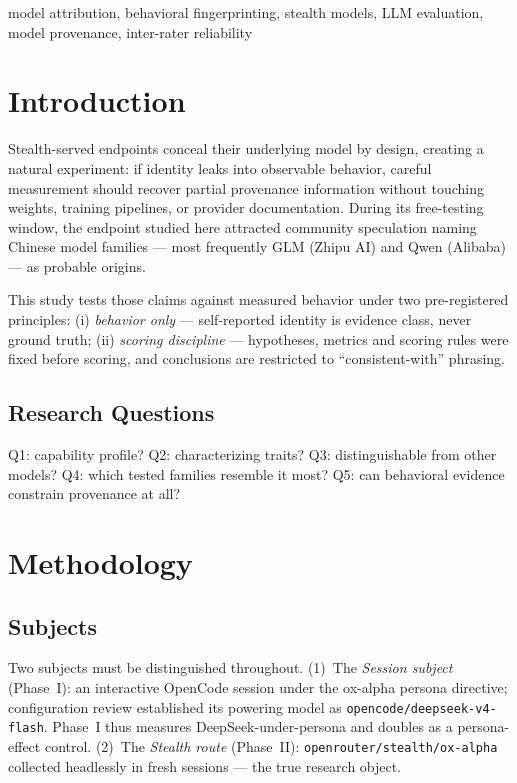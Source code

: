 \documentclass[conference]{IEEEtran}
\begin{document}
\begin{IEEEkeywords}
model attribution, behavioral fingerprinting, stealth models, LLM evaluation, model provenance, inter-rater reliability
\end{IEEEkeywords}

\section{Introduction}
Stealth-served endpoints conceal their underlying model by design, creating a natural experiment: if identity leaks into observable behavior, careful measurement should recover partial provenance information without touching weights, training pipelines, or provider documentation. During its free-testing window, the endpoint studied here attracted community speculation naming Chinese model families --- most frequently GLM (Zhipu AI) and Qwen (Alibaba) --- as probable origins.

This study tests those claims against measured behavior under two pre-registered principles: (i) \emph{behavior only} --- self-reported identity is evidence class, never ground truth; (ii) \emph{scoring discipline} --- hypotheses, metrics and scoring rules were fixed before scoring, and conclusions are restricted to ``consistent-with'' phrasing.

\subsection{Research Questions}
Q1: capability profile? Q2: characterizing traits? Q3: distinguishable from other models? Q4: which tested families resemble it most? Q5: can behavioral evidence constrain provenance at all?

\section{Methodology}

\subsection{Subjects}
Two subjects must be distinguished throughout. (1)~The \emph{Session subject} (Phase~I): an interactive OpenCode session under the ox-alpha persona directive; configuration review established its powering model as \texttt{opencode/deepseek-v4-flash}. Phase~I thus measures DeepSeek-under-persona and doubles as a persona-effect control. (2)~The \emph{Stealth route} (Phase~II): \texttt{openrouter/stealth/ox-alpha} collected headlessly in fresh sessions --- the true research object.
\end{document}

